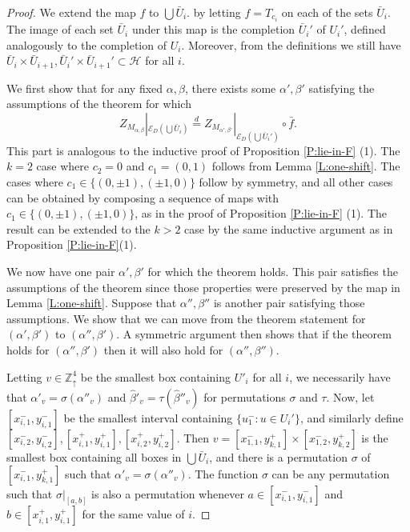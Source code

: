 \documentclass[aop, preprint]{imsart}
\theoremstyle{plain}
\theoremstyle{definition}
\theoremstyle{plain}
\newcommand{\sset}{\subset}
\newcommand{\al}{\alpha}
\newcommand{\be}{\beta}
\newcommand{\sig}{\sigma}
\newcommand{\scrE}{\mathcal{E}}
\newcommand{\Zd}{\mathds{Z}^4_\uparrow}
\newcommand{\scrH}{\mathcal{H}}
\newcommand{\eqd}{\stackrel{d}{=}}
\newcommand{\X}{\times}
\begin{document}
\begin{proof}
	We extend the map $f$ to $\bigcup \bar U_i$. by letting $f = T_{c_i}$ on each of the sets $\bar U_i$. The image of each set $\bar U_i$ under this map is the completion $\bar U_i'$ of $U_i'$, defined analogously to the completion of $U_i$. Moreover, from the definitions we still have $\bar U_i \X \bar U_{i+1}, \bar U_i' \X \bar U_{i+1}' \sset \scrH$ for all $i$.
	
	We first show that for any fixed $\al, \be$, there exists some $\al', \be'$ satisfying the assumptions of the theorem for which 
	$$
	Z_{M_{\al, \be}}|_{\scrE_D(\bigcup \bar U_i)} \eqd Z_{M_{\al', \be'}}|_{\scrE_D(\bigcup \bar U_i')} \circ \bar f.
	$$
	This part is analogous to the inductive proof of Proposition \ref{P:lie-in-F} (1). The $k = 2$ case where $c_2 = 0$ and $c_1 = (0, 1)$ follows from Lemma \ref{L:one-shift}. The cases where $c_1 \in \{(0, \pm 1), (\pm 1, 0)\}$ follow by symmetry, and all other cases can be obtained by composing a sequence of maps with $c_1 \in \{(0, \pm 1), (\pm 1, 0)\}$, as in the proof of Proposition \ref{P:lie-in-F} (1). The result can be extended to the $k > 2$ case by the same inductive argument as in Proposition \ref{P:lie-in-F}(1).
	
	We now have one pair $\al', \be'$ for which the theorem holds. This pair satisfies the assumptions of the theorem since those properties were preserved by the map in Lemma \ref{L:one-shift}. Suppose that $\al'', \be''$ is another pair satisfying those assumptions. We show that we can move from the theorem statement for $(\al', \be')$ to $(\al'', \be')$. A symmetric argument then shows that if the theorem holds for $(\al'', \be')$ then it will also hold for $(\al'', \be'')$.
	
	Letting $v \in \Zd$ be the smallest box containing $U'_i$ for all $i$, we necessarily have that $\al'_v = \sig(\al''_v)$ and $\hat \be'_v = \tau(\hat \be''_v)$ for permutations $\sig$ and $\tau$. Now, let $[x_{i,1}^-, y_{i,1}^-]$ be the smallest interval containing $\{u_1^- : u \in U_i'\}$, and similarly define 
	 $[x_{i,2}^-, y_{i,2}^-], [x_{i,1}^+, y_{i,1}^+], [x_{i,2}^+, y_{i,2}^+]$.
	 Then $v = [x_{1,1}^-, y_{k,1}^+]\X [x_{1,2}^-, y_{k,2}^+]$ is the smallest box containing all boxes in $\bigcup \bar U_i$, and there is a permutation $\sig$ of $[x_{i,1}^-, y_{k,1}^+]$ such that $\al'_v = \sig(\al''_v)$. The function $\sig$ can be any permutation such that $\sig|_{[a, b]}$ is also a permutation whenever $a \in [x_{i,1}^-, y_{i,1}^-]$ and $b \in [x_{i,1}^+, y_{i,1}^+]$ for the same value of $i$.
	 

\end{proof}
\end{document}
